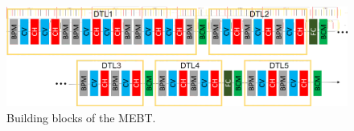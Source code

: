 \begin{figure}[!ht]
	\begin{center}
		\includegraphics[width=\textwidth]{02_BeamDiag/figures/fig000_DTL}
	\end{center}
	\caption[Building blocks of the MEBT]{Building blocks of the MEBT.}
	\label{chap2:fig:DTL}
\end{figure}